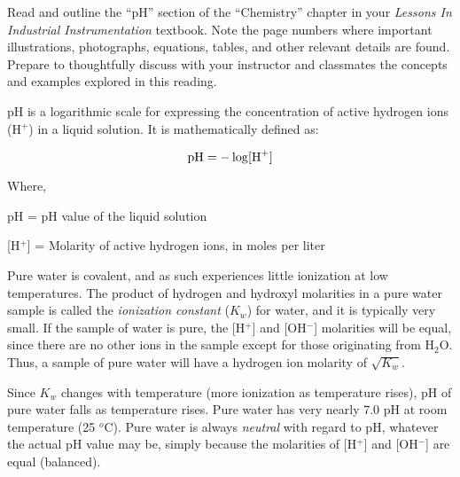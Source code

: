 
Read and outline the ``pH'' section of the ``Chemistry'' chapter in your {\it Lessons In Industrial Instrumentation} textbook.  Note the page numbers where important illustrations, photographs, equations, tables, and other relevant details are found.  Prepare to thoughtfully discuss with your instructor and classmates the concepts and examples explored in this reading.













pH is a logarithmic scale for expressing the concentration of active hydrogen ions (H$^{+}$) in a liquid solution.  It is mathematically defined as:

$$\hbox{pH} = - \log [\hbox{H}^{+}]$$

\noindent
Where,

pH = pH value of the liquid solution

[H$^{+}$] = Molarity of active hydrogen ions, in moles per liter

\vskip 10pt

Pure water is covalent, and as such experiences little ionization at low temperatures.  The product of hydrogen and hydroxyl molarities in a pure water sample is called the {\it ionization constant} ($K_w$) for water, and it is typically very small.  If the sample of water is pure, the [H$^{+}$] and [OH$^{-}$] molarities will be equal, since there are no other ions in the sample except for those originating from H$_{2}$O.  Thus, a sample of pure water will have a hydrogen ion molarity of $\sqrt{K_w}$.

Since $K_w$ changes with temperature (more ionization as temperature rises), pH of pure water falls as temperature rises.  Pure water has very nearly 7.0 pH at room temperature (25 $^{o}$C).  Pure water is always {\it neutral} with regard to pH, whatever the actual pH value may be, simply because the molarities of [H$^{+}$] and [OH$^{-}$] are equal (balanced).

\vskip 10pt

